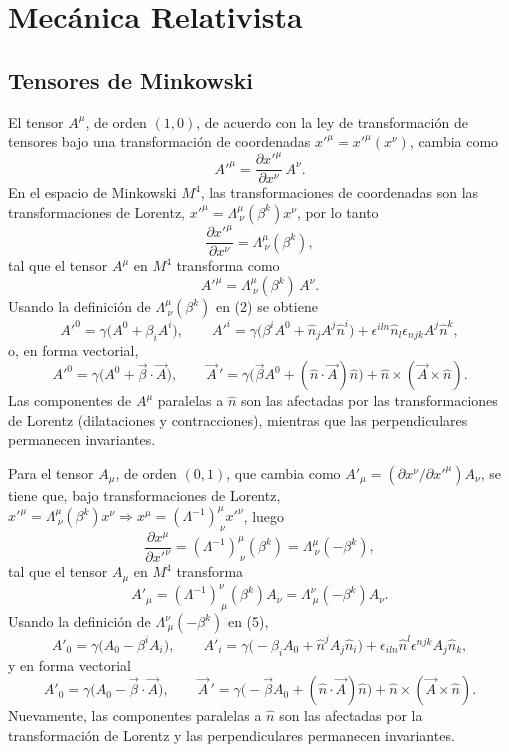 \chapter{Mecánica Relativista}

\section{Tensores de Minkowski}

El tensor $A^\mu$, de orden $(1,0)$, de acuerdo con la ley de
transformación de tensores bajo una transformación de coordenadas
$x'^\mu=x'^\mu(x^\nu)$, cambia como
\[
A'^\mu = \frac{\partial x'^\mu}{\partial x^\nu}\,A^\nu .
\]
En el espacio de Minkowski $M^4$, las transformaciones de coordenadas
son las transformaciones de Lorentz, $x'^\mu=\Lambda^\mu_{\ \nu}(\beta^k)
x^\nu$, por lo tanto
\[
\frac{\partial x'^\mu}{\partial x^\nu} = \Lambda^\mu_{\ \nu}(\beta^k),
\tag{1}
\]
tal que el tensor $A^\mu$ en $M^4$ transforma como
\[
A'^\mu = \Lambda^\mu_{\ \nu}(\beta^k)\,A^\nu . \tag{2}
\]
Usando la definición de $\Lambda^\mu_{\ \nu}(\beta^k)$ en (2) se obtiene
\[
A'^0 = \gamma\big(A^0+\beta_iA^i\big), \qquad A'^i = \gamma\big(\beta^i
A^0+\hat n_jA^j\hat n^i\big)+\epsilon^{iln}\hat n_l\epsilon_{njk}A^j
\hat n^k,
\]
o, en forma vectorial,
\[
A'^0 = \gamma\big(A^0+\vec\beta\cdot\vec A\big), \qquad \vec A\,' =
\gamma\big(\vec\beta A^0+(\hat n\cdot\vec A)\hat n\big)+\hat n\times
(\vec A\times\hat n). \tag{3}
\]
Las componentes de $A^\mu$ paralelas a $\hat n$ son las afectadas por las
transformaciones de Lorentz (dilataciones y contracciones), mientras que
las perpendiculares permanecen invariantes.

Para el tensor $A_\mu$, de orden $(0,1)$, que cambia como
$A'_\mu=(\partial x^\nu/\partial x'^\mu)A_\nu$, se tiene que, bajo
transformaciones de Lorentz, $x'^\mu=\Lambda^\mu_{\ \nu}(\beta^k)x^\nu
\Rightarrow x^\mu=(\Lambda^{-1})^\mu_{\ \nu}x'^\nu$, luego
\[
\frac{\partial x^\mu}{\partial x'^\nu} = (\Lambda^{-1})^\mu_{\ \nu}
(\beta^k) = \Lambda^\mu_{\ \nu}(-\beta^k), \tag{4}
\]
tal que el tensor $A_\mu$ en $M^4$ transforma
\[
A'_\mu = (\Lambda^{-1})^\nu_{\ \mu}(\beta^k)A_\nu = \Lambda^\nu_{\ \mu}
(-\beta^k)A_\nu . \tag{5}
\]
Usando la definición de $\Lambda^\nu_{\ \mu}(-\beta^k)$ en (5),
\[
A'_0 = \gamma\big(A_0-\beta^iA_i\big), \qquad A'_i = \gamma\big(-\beta_i
A_0+\hat n^jA_j\hat n_i\big)+\epsilon_{iln}\hat n^l\epsilon^{njk}A_j
\hat n_k,
\]
y en forma vectorial
\[
A'_0 = \gamma\big(A_0-\vec\beta\cdot\vec A\big), \qquad \vec A\,' =
\gamma\big(-\vec\beta A_0+(\hat n\cdot\vec A)\hat n\big)+\hat n\times
(\vec A\times\hat n). \tag{6}
\]
Nuevamente, las componentes paralelas a $\hat n$ son las afectadas por
la transformación de Lorentz y las perpendiculares permanecen
invariantes.

